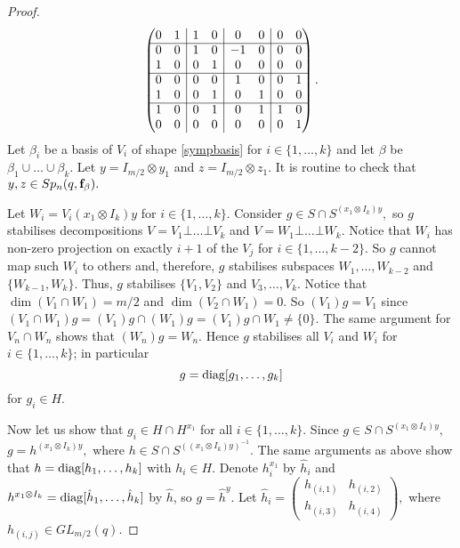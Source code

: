 \begin{proof}
\begin{equation*}
\begin{pmatrix}
0      & \multicolumn{1}{c|}{1}& 1 & \multicolumn{1}{c|}{0}&0  &\multicolumn{1}{c|}{0}&0&0 \\ \cline{1-8}
0      & \multicolumn{1}{c|}{0}& 1 & \multicolumn{1}{c|}{0}& -1&\multicolumn{1}{c|}{0}&0&0   \\
1      & \multicolumn{1}{c|}{0}& 0 & \multicolumn{1}{c|}{1}& 0 &\multicolumn{1}{c|}{0}&0&0   \\\cline{1-8}
0      & \multicolumn{1}{c|}{0}& 0 & \multicolumn{1}{c|}{0}& 1 &\multicolumn{1}{c|}{0}&0&1 \\       
1      & \multicolumn{1}{c|}{0}& 0 & \multicolumn{1}{c|}{1}& 0 &\multicolumn{1}{c|}{1}&0&0   \\\cline{1-8}
1      & \multicolumn{1}{c|}{0}& 0 & \multicolumn{1}{c|}{1}& 0 &\multicolumn{1}{c|}{1}& 1 &        0\\
0      & \multicolumn{1}{c|}{0}& 0 & \multicolumn{1}{c|}{0}& 0 &\multicolumn{1}{c|}{0}& 0 &        1
\end{pmatrix}.
\end{equation*}
Let $\beta_i$ be a basis of $V_i$ of shape \eqref{sympbasis} for $i \in \{1, \ldots, k\}$ and let $\beta$ be $\beta_1 \cup \ldots \cup \beta_k$. Let $y=I_{m/2} \otimes y_1$ and $z=I_{m/2} \otimes z_1$.  It is routine to check that $y,z \in Sp_n(q, {\bf f}_{\beta}).$

Let $W_i=V_i(x_1 \otimes I_k)y$ for $i \in \{1, \ldots, k\}.$ Consider $g \in S \cap S^{(x_1 \otimes I_k)y},$ so $g$ stabilises decompositions $V=V_1 \bot \ldots \bot V_k$ and $V=W_1 \bot \ldots \bot W_k.$ Notice that $W_i$ has non-zero projection on exactly $i+1$ of the $V_j$ for $i \in \{1, \ldots, k-2\}.$ So $g$ cannot map such $W_i$ to others and, therefore, $g$ stabilises subspaces $W_1, \ldots, W_{k-2}$ and $\{W_{k-1}, W_k\}.$ Thus, $g$ stabilises $\{V_1, V_2\}$ and $V_3, \ldots, V_k.$ Notice that $\dim(V_1 \cap W_1)=m/2$ and $\dim(V_2 \cap W_1)=0.$ So $(V_1)g=V_1$ since $(V_1 \cap W_1)g=(V_1)g \cap (W_1)g=(V_1)g \cap W_1 \ne \{0\}.$ The same argument for $V_n \cap W_n$ shows that $(W_n)g=W_n$. Hence $g$ stabilises all $V_i$ and $W_i$ for $i \in \{1, \ldots, k\}$; in particular $$g= \mathrm{diag}[g_1, \ldots, g_k]$$
for $g_i \in H.$

Now let us show that  $g_i \in H \cap H^{x_1}$ for all $i \in \{1, \ldots, k\}.$ Since $g \in S \cap S^{(x_1 \otimes I_k)y},$ $g=h^{(x_1 \otimes I_k)y},$ where $h \in S \cap S^{((x_1 \otimes I_k)y)^{-1}}.$ The same arguments as above show that $h = \mathrm{diag}[h_1, \ldots, h_k]$ with $h_i \in H.$ Denote $h_i^{x_1}$ by $\hat{h}_i$ and $h^{x_1 \otimes I_k}=\mathrm{diag}[\hat{h}_1, \ldots, \hat{h}_k]$ by $\hat{h}$, so $g= \hat{h}^y.$ Let $\hat{h}_i = 
\left( \begin{smallmatrix}
h_{(i,1)} & h_{(i,2)}\\
h_{(i,3)} & h_{(i,4)}
\end{smallmatrix} \right),
$ where $h_{(i,j)} \in GL_{m/2}(q).$


\end{proof}
